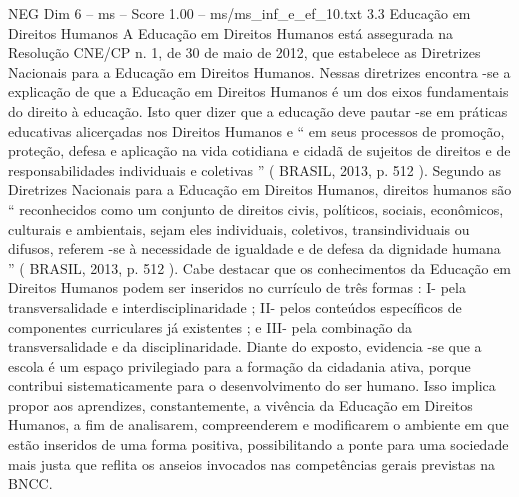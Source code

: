 \begin{textsample}{NEG Dim 6 – ms – Score 1.00 – ms/ms\_inf\_e\_ef\_10.txt}  \label{ex:f6_neg_234}
3.3 Educação em Direitos Humanos A Educação em Direitos Humanos está assegurada na Resolução CNE/CP n. 1, de 30 de maio de 2012, que estabelece as Diretrizes Nacionais para a Educação em Direitos Humanos.
Nessas diretrizes encontra -se a explicação de que a Educação em Direitos Humanos é um dos eixos fundamentais do direito à educação.
Isto quer dizer que a educação deve pautar -se em práticas educativas alicerçadas nos Direitos Humanos e “ em seus processos de promoção, proteção, defesa e aplicação na vida cotidiana e cidadã de sujeitos de direitos e de responsabilidades individuais e coletivas ” ( BRASIL, 2013, p. 512 ).
Segundo as Diretrizes Nacionais para a Educação em Direitos Humanos, direitos humanos são “ reconhecidos como um conjunto de direitos civis, políticos, sociais, econômicos, culturais e ambientais, sejam eles individuais, coletivos, transindividuais ou difusos, referem -se à necessidade de igualdade e de defesa da dignidade humana ” ( BRASIL, 2013, p. 512 ).
Cabe destacar que os conhecimentos da Educação em Direitos Humanos podem ser inseridos no currículo de três formas : I- pela transversalidade e interdisciplinaridade ; II- pelos conteúdos específicos de componentes curriculares já existentes ; e III- pela combinação da transversalidade e da disciplinaridade.
Diante do exposto, evidencia -se que a escola é um espaço privilegiado para a formação da cidadania ativa, porque contribui sistematicamente para o desenvolvimento do ser humano.
Isso implica propor aos aprendizes, constantemente, a vivência da Educação em Direitos Humanos, a fim de analisarem, compreenderem e modificarem o ambiente em que estão inseridos de uma forma positiva, possibilitando a ponte para uma sociedade mais justa que reflita os anseios invocados nas competências gerais previstas na BNCC.

\end{textsample}
